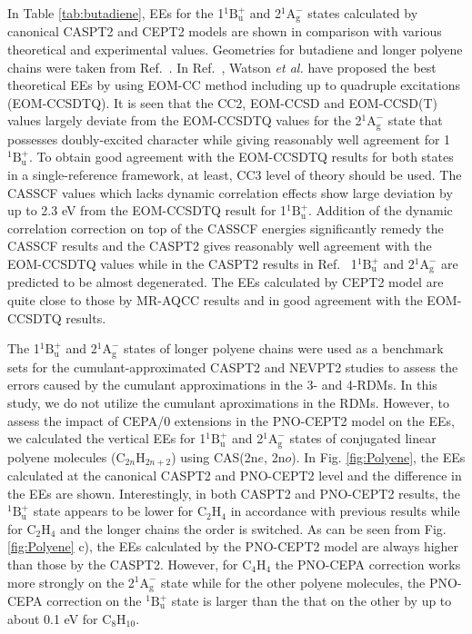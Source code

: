 \documentclass[aip,jcp,amsmath]{revtex4-1}
\begin{document}
%
In Table \ref{tab:butadiene}, EEs for the 1${}^1\text{B}_\text{u}^{+}$ and 2${}^1\text{A}_\text{g}^{-}$ states calculated by canonical CASPT2 and CEPT2 models are shown in comparison with various theoretical and experimental values.
%
Geometries for butadiene and longer polyene chains were taken from Ref.~.
%
In Ref.~, Watson {\it et al.} have proposed the best theoretical EEs by using EOM-CC method including up to quadruple excitations (EOM-CCSDTQ).
%
It is seen that the CC2, EOM-CCSD and EOM-CCSD(T) values largely deviate from the EOM-CCSDTQ values for the 2${}^1\text{A}_\text{g}^{-}$ state that possesses doubly-excited character while giving reasonably well agreement for 1${}^1\text{B}_\text{u}^{+}$.
%
To obtain good agreement with the EOM-CCSDTQ results for both states in a single-reference framework, at least, CC3 level of theory should be used.
%
The CASSCF values which lacks dynamic correlation effects show large deviation by up to 2.3 eV from the EOM-CCSDTQ result for 1${}^1\text{B}_\text{u}^{+}$.
%
Addition of the dynamic correlation correction on top of the CASSCF energies significantly remedy the CASSCF results and the CASPT2 gives reasonably well agreement with the EOM-CCSDTQ values while in the CASPT2 results in Ref.~ 1${}^1\text{B}_\text{u}^{+}$ and 2${}^1\text{A}_\text{g}^{-}$ are predicted to be almost degenerated.
%
The EEs calculated by CEPT2 model are quite close to those by MR-AQCC results and in good agreement with the EOM-CCSDTQ results.

%
The 1${}^1\text{B}_\text{u}^{+}$ and 2${}^1\text{A}_\text{g}^{-}$ states of longer polyene chains were used as a benchmark sets for the cumulant-approximated CASPT2\cite{doi:10.1063/1.4900878} and NEVPT2\cite{Zgid2009} studies to assess the errors caused by the cumulant approximations in the 3- and 4-RDMs.
%
In this study, we do not utilize the cumulant aproximations in the RDMs.
%
However, to assess the impact of CEPA/0 extensions in the PNO-CEPT2 model on the EEs, we calculated the vertical EEs for 1${}^1\text{B}_\text{u}^{+}$ and 2${}^1\text{A}_\text{g}^{-}$ states of conjugated linear polyene molecules (C${}_{2n}$H${}_{2n+2}$) using CAS(2n$e$, 2n$o$).
%
In Fig. \ref{fig:Polyene}, the EEs calculated at the canonical CASPT2 and PNO-CEPT2 level and the difference in the EEs are shown.
%
Interestingly, in both CASPT2 and PNO-CEPT2 results, the ${}^1\text{B}_\text{u}^{+}$ state appears to be lower for C${}_2$H${}_4$ in accordance with previous results\cite{doi:10.1063/1.4900878} while for C${}_2$H${}_4$ and the longer chains the order is switched.
%
As can be seen from Fig. \ref{fig:Polyene} c), the EEs calculated by the PNO-CEPT2 model are always higher than those by the CASPT2.
%
However, for C${}_4$H${}_4$ the PNO-CEPA correction works more strongly on the 2${}^1\text{A}_\text{g}^{-}$ state while for the other polyene molecules, the PNO-CEPA correction on the ${}^1\text{B}_\text{u}^{+}$ state is larger than the that on the other by up to about 0.1 eV for C${}_8$H${}_{10}$.
\end{document}
